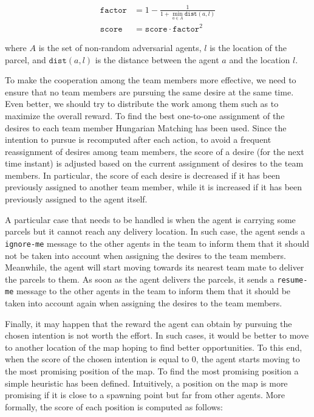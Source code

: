 \begin{align*}
    \texttt{factor} & = 1 - \frac{1}{1 + \min_{a \in A} \texttt{dist}(a, l)} \\
    \texttt{score}  & = \texttt{score} \cdot \texttt{factor}^2
\end{align*}

where $A$ is the set of non-random adversarial agents, $l$ is the location of the parcel, and $\texttt{dist}(a, l)$ is the distance between the agent $a$ and the location $l$.

To make the cooperation among the team members more effective, we need to ensure that no team members are pursuing the same desire at the same time. Even better, we should try to distribute the work among them such as to maximize the overall reward. To find the best one-to-one assignment of the desires to each team member Hungarian Matching \parencite{hungarian} has been used. Since the intention to pursue is recomputed after each action, to avoid a frequent reassignment of desires among team members, the score of a desire (for the next time instant) is adjusted based on the current assignment of desires to the team members. In particular, the score of each desire is decreased if it has been previously assigned to another team member, while it is increased if it has been previously assigned to the agent itself.

A particular case that needs to be handled is when the agent is carrying some parcels but it cannot reach any delivery location. In such case, the agent sends a \texttt{ignore-me} message to the other agents in the team to inform them that it should not be taken into account when assigning the desires to the team members. Meanwhile, the agent will start moving towards its nearest team mate to deliver the parcels to them. As soon as the agent delivers the parcels, it sends a \texttt{resume-me} message to the other agents in the team to inform them that it should be taken into account again when assigning the desires to the team members.

Finally, it may happen that the reward the agent can obtain by pursuing the chosen intention is not worth the effort. In such cases, it would be better to move to another location of the map hoping to find better opportunities. To this end, when the score of the chosen intention is equal to 0, the agent starts moving to the most promising position of the map. To find the most promising position a simple heuristic has been defined. Intuitively, a position on the map is more promising if it is close to a spawning point but far from other agents. More formally, the score of each position is computed as follows:

